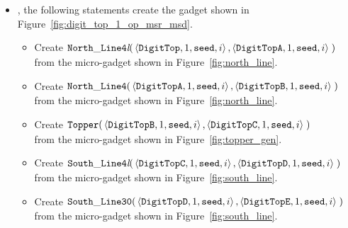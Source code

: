 \begin{itemize}
    \item {\dtop}, the following statements create the gadget shown in Figure~\ref{fig:digit_top_1_op_msr_msd}.
    \begin{itemize}
        \item Create
        $\begin{aligned}[t]
            {\tt North\_Line4\textit{l}}(& \left\langle {\tt DigitTop},  1, {\tt seed}, i \right\rangle,
                                           \left\langle {\tt DigitTopA}, 1, {\tt seed}, i \right\rangle \;)
        \end{aligned}$\\from the micro-gadget shown in Figure~\ref{fig:north_line}.

        \item Create $\begin{aligned}[t]
            {\tt North\_Line4}(& \left\langle {\tt DigitTopA}, 1, {\tt seed}, i \right\rangle,
                                 \left\langle {\tt DigitTopB}, 1, {\tt seed}, i \right\rangle \;)
        \end{aligned}$\\from the micro-gadget shown in Figure~\ref{fig:north_line}.

        \item Create $\begin{aligned}[t]
            {\tt Topper}(& \left\langle {\tt DigitTopB}, 1, {\tt seed}, i \right\rangle,
                           \left\langle {\tt DigitTopC}, 1, {\tt seed}, i \right\rangle \;)
        \end{aligned}$\\from the micro-gadget shown in Figure~\ref{fig:topper_gen}.

        \item Create
        $\begin{aligned}[t]
            {\tt South\_Line4\textit{l}}(& \left\langle {\tt DigitTopC}, 1, {\tt seed}, i \right\rangle,
                                           \left\langle {\tt DigitTopD}, 1, {\tt seed}, i \right\rangle \;)
        \end{aligned}$\\from the micro-gadget shown in Figure~\ref{fig:south_line}.

        \item Create
        $\begin{aligned}[t]
            {\tt South\_Line30}(& \left\langle {\tt DigitTopD}, 1, {\tt seed}, i \right\rangle,
                                  \left\langle {\tt DigitTopE}, 1, {\tt seed}, i \right\rangle \;)
        \end{aligned}$\\from the micro-gadget shown in Figure~\ref{fig:south_line}.


\end{itemize}
\end{itemize}
